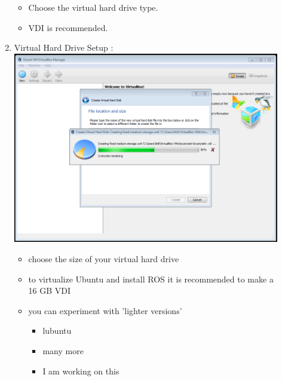 \documentclass[12pt]{article}
\begin{document}
\begin{description}
\begin{enumerate}
\begin{itemize}
                \item Choose the virtual hard drive type. 
                \item VDI is recommended.
                           
        \end{itemize}
\newpage
\item Virtual Hard Drive Setup : \vspace{20mm} \\
      		\includegraphics[scale=.6]{Capture6.png}\\
             \begin{itemize}
                    
                \item choose the size of your virtual hard drive       
                \item to virtualize Ubuntu and install ROS it is recommended to make a 16 GB VDI
                \item  you can experiment with 'lighter versions' 
          
                    \begin{itemize}
                            
                        \item lubuntu     
                        \item many more
                        \item I am working on this
                        
                    \end{itemize}
                

\end{itemize}
\end{enumerate}
\end{description}
\end{document}
